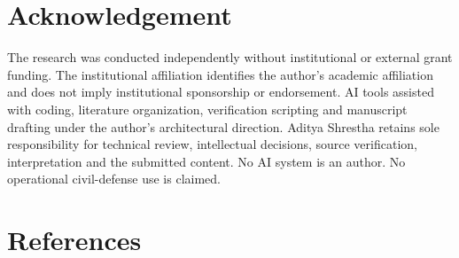 \documentclass[10pt,twocolumn]{article}
\begin{document}
\section*{Acknowledgement}
The research was conducted independently without institutional or external grant funding. The institutional affiliation identifies the author's academic affiliation and does not imply institutional sponsorship or endorsement. AI tools assisted with coding, literature organization, verification scripting and manuscript drafting under the author's architectural direction. Aditya Shrestha retains sole responsibility for technical review, intellectual decisions, source verification, interpretation and the submitted content. No AI system is an author. No operational civil-defense use is claimed.

\section*{References}
\end{document}
